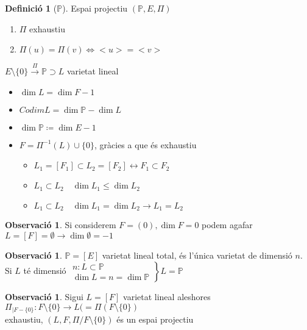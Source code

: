 \documentclass{article}
\theoremstyle{definition}
\newtheorem{definition}[theorem]{Definició}
\newtheorem{observation}[theorem]{Observació}
\newcommand{\PP}{\mathbb{P}}
\begin{document}
\begin{definition}[$\PP$]
Espai projectiu $(\PP, E, \Pi)$
\begin{enumerate}
\item $\Pi$ exhaustiu
\item $\Pi(u) = \Pi(v) \Leftrightarrow <u> = <v>$
\end{enumerate}
\end{definition}

$E\setminus\{0\} \xrightarrow{\Pi} \PP \supset L$ varietat lineal
\begin{itemize}
\item $\dim L = \dim F -1$
\item $Codim L = \dim \PP - \dim L$
\item $\dim \PP \coloneqq \dim E -1$
\item $F = \Pi^{-1}(L) \cup \{0\}$, gràcies a que és exhaustiu
	\begin{itemize}
	\item $L_1 = [F_1] \subset L_2 = [F_2] \leftrightarrow F_1 \subset F_2$
	\item $L_1 \subset L_2 \quad \dim L_1 \leq \dim L_2$
	\item $L_1 \subset L_2 \quad \dim L_1 = \dim L_2 \to L_1 = L_2$
	\end{itemize}
\end{itemize}

\begin{observation}
Si considerem $F = (0), \dim F = 0$ podem agafar $L = [F] = \emptyset \to \dim \emptyset = -1$
\end{observation}

\begin{observation}
$\PP = [E]$ varietat lineal total, és l'única varietat de dimensió $n$.\\
Si $L$ té dimensió $\left.\begin{array}{c}n: L \subset \PP\\\dim L = n = \dim \PP\end{array}\right\} L = \PP$
\end{observation}

\begin{observation}
Sigui $L=[F]$ varietat lineal aleshores $\Pi_{|F-\{0\}}:F\setminus \{0\} \to L (= \Pi(F\setminus \{0\})$\\
exhaustiu, $(L, F, \Pi/F\setminus \{0\})$ és un espai projectiu
\end{observation}
\end{document}
